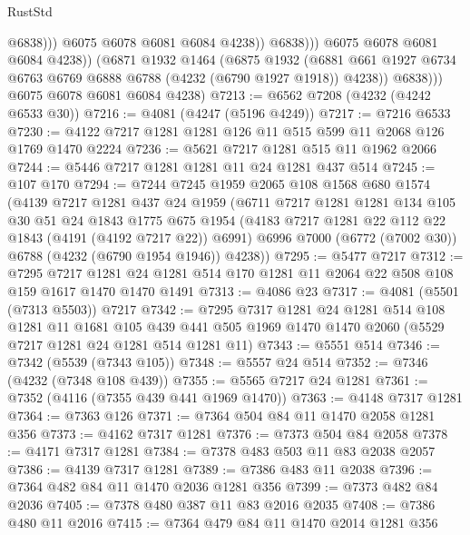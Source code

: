 \begin{lexlean}{RustStd}
\begin{coremodule}
                              @6838)))
                        @6075
                        @6078
                        @6081
                        @6084
                        @4238))
                    @6838)))
              @6075
              @6078
              @6081
              @6084
              @4238))
          (@6871
            @1932
            @1464
            (@6875
              @1932
              (@6881 @661 @1927 @6734 @6763 @6769 @6888 @6788 (@4232 (@6790 @1927 @1918)) @4238))
            @6838)))
      @6075
      @6078
      @6081
      @6084
      @4238)
@7213 := @6562 @7208 (@4232 (@4242 @6533 @30))
@7216 := @4081 (@4247 (@5196 @4249))
@7217 := @7216 @6533
@7230 := @4122 @7217 @1281 @1281 @126 @11 @515 @599 @11 @2068 @126 @1769 @1470 @2224
@7236 := @5621 @7217 @1281 @515 @11 @1962 @2066
@7244 := @5446 @7217 @1281 @1281 @11 @24 @1281 @437 @514
@7245 := @107 @170
@7294 := @7244
    @7245
    @1959
    @2065
    @108
    @1568
    @680
    @1574
    (@4139
      @7217
      @1281
      @437
      @24
      @1959
      (@6711
        @7217
        @1281
        @1281
        @134
        @105
        @30
        @51
        @24
        @1843
        @1775
        @675
        @1954
        (@4183 @7217 @1281 @22 @112 @22 @1843 (@4191 (@4192 @7217 @22)) @6991)
        @6996
        @7000
        (@6772 (@7002 @30))
        @6788
        (@4232 (@6790 @1954 @1946))
        @4238))
@7295 := @5477 @7217
@7312 := @7295
    @7217
    @1281
    @24
    @1281
    @514
    @170
    @1281
    @11
    @2064
    @22
    @508
    @108
    @159
    @1617
    @1470
    @1470
    @1491
@7313 := @4086 @23
@7317 := @4081 (@5501 (@7313 @5503)) @7217
@7342 := @7295
    @7317
    @1281
    @24
    @1281
    @514
    @108
    @1281
    @11
    @1681
    @105
    @439
    @441
    @505
    @1969
    @1470
    @1470
    @2060
    (@5529 @7217 @1281 @24 @1281 @514 @1281 @11)
@7343 := @5551 @514
@7346 := @7342 (@5539 (@7343 @105))
@7348 := @5557 @24 @514
@7352 := @7346 (@4232 (@7348 @108 @439))
@7355 := @5565 @7217 @24 @1281
@7361 := @7352 (@4116 (@7355 @439 @441 @1969 @1470))
@7363 := @4148 @7317 @1281
@7364 := @7363 @126
@7371 := @7364 @504 @84 @11 @1470 @2058 @1281 @356
@7373 := @4162 @7317 @1281
@7376 := @7373 @504 @84 @2058
@7378 := @4171 @7317 @1281
@7384 := @7378 @483 @503 @11 @83 @2038 @2057
@7386 := @4139 @7317 @1281
@7389 := @7386 @483 @11 @2038
@7396 := @7364 @482 @84 @11 @1470 @2036 @1281 @356
@7399 := @7373 @482 @84 @2036
@7405 := @7378 @480 @387 @11 @83 @2016 @2035
@7408 := @7386 @480 @11 @2016
@7415 := @7364 @479 @84 @11 @1470 @2014 @1281 @356

\end{coremodule}
\end{lexlean}
